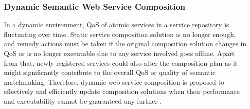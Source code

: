 \subsubsection{Dynamic Semantic Web Service Composition}
In a dynamic environment, QoS of atomic services in a service repository is fluctuating over time. Static service composition solution is no longer enough, and remedy actions must be taken if the original composition solution changes in QoS or is no longer executable due to any service involved goes offline. Apart from that, newly registered services could also alter the composition plan as it might significantly contribute to the overall QoS or quality of semantic matchmaking. Therefore, dynamic web service composition is proposed to effectively and efficiently update composition solutions when their performance and executability cannot be guaranteed any further \cite{li2014fault}. 


